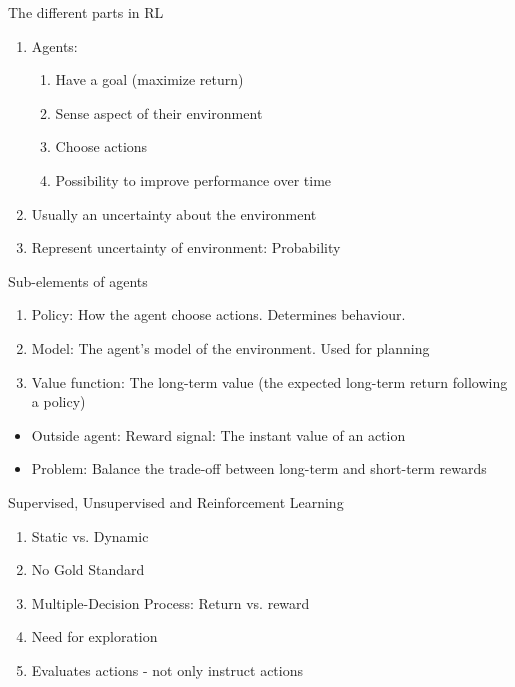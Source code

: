 \documentclass[10pt]{beamer}
\begin{document}
\begin{frame}{The different parts in RL}

\begin{enumerate}
\item Agents:
\begin{enumerate}
\item Have a {\color{uured} goal} (maximize return)
\item {\color{uured} Sense} aspect of their environment
\item Choose {\color{uured} actions}
\item Possibility to {\color{uured} improve performance over time}
\end{enumerate}
\pause
\item Usually an {\color{uured} uncertainty} about the environment
\item Represent uncertainty of environment: {\color{uured} Probability}
\end{enumerate}

\end{frame}


\begin{frame}{Sub-elements of agents}

\begin{enumerate}
\item {\color{uured} Policy}: How the agent choose actions. Determines behaviour.
\item {\color{uured} Model}: The agent's model of the environment. Used for {\color{uured} planning}\pause
\item {\color{uured} Value function}: The long-term value (the expected long-term return following a policy)
\end{enumerate}
\pause
\begin{itemize}
\item Outside agent: {\color{uured} Reward signal}: The instant value of an action\pause
\item Problem: {\color{uured} Balance} the trade-off between long-term and short-term rewards
\end{itemize}

\end{frame}

\begin{frame}{Supervised, Unsupervised and Reinforcement Learning}

\begin{enumerate}
\item Static vs. Dynamic \pause
\item No Gold Standard \pause
\item Multiple-Decision Process: Return vs. reward\pause
\item Need for exploration\pause
\item Evaluates actions - not only instruct actions
\end{enumerate}

\end{frame}
\end{document}
